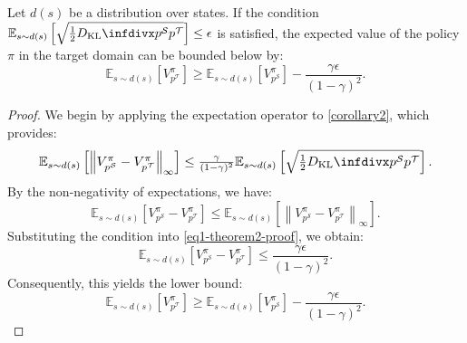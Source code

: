 \setcounter{theorem}{0}
\begin{theorem} 
\label{theorem2}
Let \( d(s) \) be a distribution over states. If the condition $\mathbb{E}_{s \sim d(s)} \left[ \sqrt{\frac{1}{2} \infdiv{p^{\mathcal{S}}}{p^{\mathcal{T}}}} \right] \leq \epsilon$ is satisfied, the expected value of the policy \(\pi\) in the target domain can be bounded below by:
\begin{equation} 
\label{eq-theorem2}
\mathbb{E}_{s \sim d(s)} \left[ V_{p^{\mathcal{T}}}^{\pi} \right] \geq \mathbb{E}_{s \sim d(s)} \left[ V_{p^{\mathcal{S}}}^{\pi} \right] - \frac{\gamma \epsilon}{(1-\gamma)^2}.
\end{equation}
\end{theorem}

\begin{proof}
We begin by applying the expectation operator to \autoref{corollary2}, which provides:
\begin{equation} 
\label{eq1-theorem2-proof}
\resizebox{0.9\hsize}{!}{$
\mathbb{E}_{s \sim d(s)} \left[ \left\| V_{p^{\mathcal{S}}}^{\pi} - V_{p^{\mathcal{T}}}^{\pi} \right\|_{\infty} \right] \leq \frac{\gamma}{(1-\gamma)^2} \mathbb{E}_{s \sim d(s)} \left[ \sqrt{\frac{1}{2}\infdiv{p^{\mathcal{S}}}{p^{\mathcal{T}}}} \right].
$}
\end{equation}
By the non-negativity of expectations, we have:
\begin{equation} 
\label{eq2-theorem2-proof}
\mathbb{E}_{s \sim d(s)} \left[ V_{p^{\mathcal{S}}}^{\pi} - V_{p^{\mathcal{T}}}^{\pi} \right] \leq \mathbb{E}_{s \sim d(s)} \left[ \left\| V_{p^{\mathcal{S}}}^{\pi} - V_{p^{\mathcal{T}}}^{\pi} \right\|_{\infty} \right].
\end{equation}
Substituting the condition into \autoref{eq1-theorem2-proof}, we obtain:
\begin{equation} 
\label{eq3-theorem2-proof}
\mathbb{E}_{s \sim d(s)} \left[ V_{p^{\mathcal{S}}}^{\pi} - V_{p^{\mathcal{T}}}^{\pi} \right] \leq \frac{\gamma \epsilon}{(1-\gamma)^2}.
\end{equation}
Consequently, this yields the lower bound:
\begin{equation} 
\label{eq4-theorem2-proof}
\mathbb{E}_{s \sim d(s)} \left[ V_{p^{\mathcal{T}}}^{\pi} \right] \geq \mathbb{E}_{s \sim d(s)} \left[ V_{p^{\mathcal{S}}}^{\pi} \right] - \frac{\gamma \epsilon}{(1-\gamma)^2}.
\end{equation}
\end{proof}


